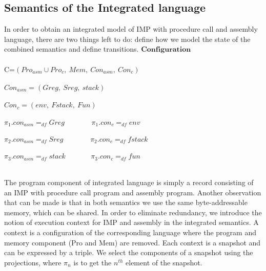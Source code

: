 \documentclass[letterpaper, 10 pt, conference]{IEEEtran}
\begin{document}
\subsection{Semantics of the Integrated language}
\par In order to obtain an integrated model of IMP with procedure call and assembly language, there are two things left to
do: define how we model the state of the combined semantics and define transitions.
$\textbf{Configuration}$\\ \\
C=$(Pro_{asm}\cup Pro_c,~Mem,~Con_{asm},~Con_{c})$\\ \\
$Con_{asm}=(Greg,~Sreg,~stack)$\\ \\
$Con_c=(env,~Fstack,~Fun)$\\ \\
$\pi_1.con_{asm}=_{df}Greg~~~~~~~~~~~~~~~~~\pi_1.con_c=_{df}env$\\\\
$\pi_2.con_{asm}=_{df}Sreg~~~~~~~~~~~~~~~~~\pi_2.con_c=_{df}fstack$\\\\
$\pi_3.con_{asm}=_{df}stack~~~~~~~~~~~~~~~~\pi_3.con_c=_{df}fun$\\ \\
\par The program component of integrated language is simply a record consisting of an IMP with procedure call program and assembly program. Another observation that can be made is that in both
semantics we use the same byte-addressable memory, which can be shared. In order to eliminate redundancy, we introduce the notion of execution context for IMP and assembly in the integrated semantics.  A context is a configuration of the corresponding language
where the program and memory component (Pro and Mem) are removed. Each context is a snapshot and can be expressed by a triple. We select the components of a snapshot using the projections, where $\pi_n$ is to get the $n^{th}$ element of the snapshot.\\ \\
\end{document}
